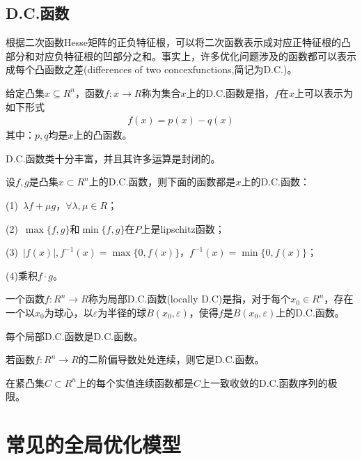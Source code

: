     \subsection{D.C.函数}
        \par
        根据二次函数Hesse矩阵的正负特征根，可以将二次函数表示成对应正特征根的凸部分和对应负特征根的凹部分之和。事实上，许多优化问题涉及的函数都可以表示成每个凸函数之差(differences of two concexfunctions,简记为D.C.)。
        \begin{definition}[D.C.函数]
        给定凸集$x\subseteq R^n$，函数$f:x\to R$称为集合$x$上的D.C.函数是指，$f$在$x$上可以表示为如下形式
          \begin{align*}
          f(x)=p(x)-q(x)
          \end{align*}
        其中：$p,q$均是$x$上的凸函数。
        \end{definition}
        \par
        D.C.函数类十分丰富，并且其许多运算是封闭的。
        \begin{theorem}
        设$f,g$是凸集$x\subset R^n$上的D.C.函数，则下面的函数都是$x$上的D.C.函数：
          \par
          (1)\ $\lambda f+\mu g$，$\forall \lambda,\mu \in R$；
          \par
          (2)\ ${\max}\{f,g\}$和${\min}\{f,g\}$在$P$上是lipschitz函数；
          \par
          (3)\ $|f(x)|,f^{-1}(x)={\max}\{0,f(x)\}$，$f^{-1}(x)={\min}\{0,f(x)\}$；
          \par
          (4)乘积$f\cdot g$。
        \end{theorem}
        \begin{definition}[局部D.C.函数]
        一个函数$f:R^n\to R$称为局部D.C.函数(locally D.C)是指，对于每个$x_0\in R^n$，存在一个以$x_0$为球心，以$\varepsilon$为半径的球$B(x_0,\varepsilon)$，使得$f$是$B(x_0,\varepsilon)$上的D.C.函数。
        \end{definition}
        \begin{theorem}
        每个局部D.C.函数是D.C.函数。
        \end{theorem}
        \begin{theorem}
        若函数$f:R^n\to R$的二阶偏导数处处连续，则它是D.C.函数。
        \end{theorem}
        \begin{theorem}
        在紧凸集$C\subset R^n$上的每个实值连续函数都是$C$上一致收敛的D.C.函数序列的极限。
        \end{theorem}
\section{常见的全局优化模型}

